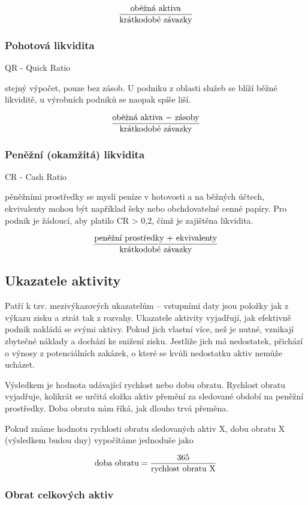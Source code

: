 $$\dfrac{\text{oběžná aktiva}}{\text{krátkodobé závazky}}$$

\subsubsection{Pohotová likvidita} 

QR - Quick Ratio

stejný výpočet, pouze bez zásob. U podniku z oblasti služeb se blíží běžné likviditě, u výrobních podniků se naopak spíše liší.

$$\dfrac{\text{oběžná aktiva $-$ zásoby}}{\text{krátkodobé závazky}}$$

\subsubsection{Peněžní (okamžitá) likvidita}

CR - Cash Ratio

pěněžními prostředky se myslí peníze v hotovosti a na běžných účtech, ekvivalenty mohou být například šeky nebo obchdovatelné cenné papíry. Pro podnik je žádoucí, aby platilo CR > 0,2, čímž je zajištěna likvidita.

$$\dfrac{\text{peněžní prostředky $+$ ekvivalenty}}{\text{krátkodobé závazky}}$$






\subsection{Ukazatele aktivity}
Patří k tzv. mezivýkazových ukazatelům -- vstupními daty jsou položky jak z výkazu zisku a ztrát tak z rozvahy. Ukazatele aktivity vyjadřují, jak efektivně podnik nakládá se svými aktivy. Pokud jich vlastní více, než je nutné, vznikají zbytečné náklady a dochází ke snižení zisku. Jestliže jich má nedostatek, přichází o výnosy z potenciálních zakázek, o které se kvůli nedostatku aktiv nemůže ucházet.

Výsledkem je hodnota udávající rychlost nebo dobu obratu. Rychlost obratu vyjadřuje, kolikrát se určitá složka aktiv přemění za sledované období na peněžní prostředky. Doba obratu nám říká, jak dlouho trvá přeměna.

Pokud známe hodnotu rychlosti obratu sledovaných aktiv X, dobu obratu X (výsledkem budou dny) vypočítáme jednoduše jako 

$$\text{doba obratu} = \dfrac{\text{365}}{\text{rychlost obratu X}}$$

\subsubsection{Obrat celkových aktiv}


